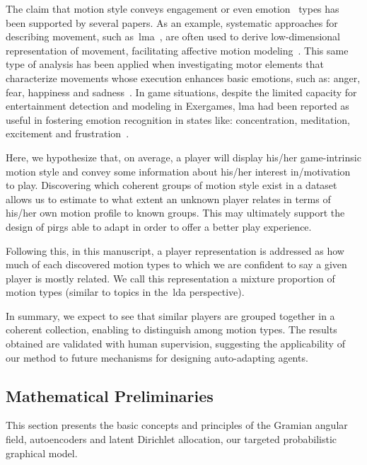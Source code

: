 The claim that motion style conveys engagement or even emotion~\cite{aristidou_emotion_2015,shafir_emotion_2016,tsachor_somatic_2017} types has been supported by several papers. As an example, systematic approaches for describing movement, such as~\gls{lma}~\cite{laban_language_1974}, are often used to derive low-dimensional representation of movement, facilitating affective motion modeling~\cite{burton_laban_2016}. This same type of analysis has been applied when investigating motor elements that characterize movements whose execution enhances basic emotions, such as: anger, fear, happiness and sadness~\cite{shafir_emotion_2016}. In game situations, despite the limited capacity for entertainment detection and modeling in Exergames, \gls{lma} had been reported as useful in fostering emotion recognition in states like: concentration, meditation, excitement and frustration~\cite{zacharatos_emotion_2013}.

Here, we hypothesize that, on average, a player will display his/her game-intrinsic motion style and convey some information about his/her interest in/motivation to play. Discovering which coherent groups of motion style exist in a dataset allows us to estimate to what extent an unknown player relates in terms of his/her own motion profile to known groups. This may ultimately support the design of \gls{pirg}s able to adapt in order to offer a better play experience.

Following this, in this manuscript, a player representation is addressed as how much of each discovered motion types to which we are confident to say a given player is mostly related. %
We call this representation a {mixture proportion of motion types} (similar to topics in the~\gls{lda} perspective). 

In summary, we expect to see that similar players are grouped together in a coherent collection, enabling to distinguish among motion types. The results obtained are validated with human supervision, suggesting the applicability of our method to future mechanisms for designing auto-adapting agents.

\subsection{Mathematical Preliminaries}

This section presents the basic concepts and principles of the Gramian angular field, autoencoders and latent Dirichlet allocation, our targeted probabilistic graphical model. %


